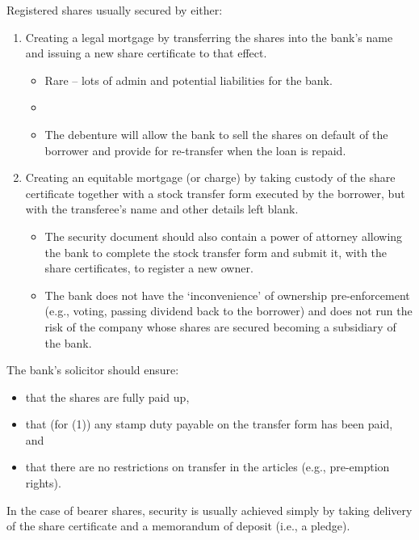 \documentclass[
]{article}
\providecommand{\tightlist}{%
  \setlength{\itemsep}{0pt}\setlength{\parskip}{0pt}}
\begin{document}
Registered shares usually secured by either:

\begin{enumerate}
\def\labelenumi{\arabic{enumi}.}
\tightlist
\item
  Creating a legal mortgage by transferring the shares into the bank's
  name and issuing a new share certificate to that effect.

  \begin{itemize}
  \tightlist
  \item
    Rare -- lots of admin and potential liabilities for the bank.
  \item
  \item
    The debenture will allow the bank to sell the shares on default of
    the borrower and provide for re-transfer when the loan is repaid.
  \end{itemize}
\item
  Creating an equitable mortgage (or charge) by taking custody of the
  share certificate together with a stock transfer form executed by the
  borrower, but with the transferee's name and other details left blank.

  \begin{itemize}
  \tightlist
  \item
    The security document should also contain a power of attorney
    allowing the bank to complete the stock transfer form and submit it,
    with the share certificates, to register a new owner.
  \item
    The bank does not have the `inconvenience' of ownership
    pre-enforcement (e.g., voting, passing dividend back to the
    borrower) and does not run the risk of the company whose shares are
    secured becoming a subsidiary of the bank.
  \end{itemize}
\end{enumerate}

The bank's solicitor should ensure:

\begin{itemize}
\tightlist
\item
  that the shares are fully paid up,
\item
  that (for (1)) any stamp duty payable on the transfer form has been
  paid, and
\item
  that there are no restrictions on transfer in the articles (e.g.,
  pre-emption rights).
\end{itemize}

In the case of bearer shares, security is usually achieved simply by
taking delivery of the share certificate and a memorandum of deposit
(i.e., a pledge).
\end{document}
